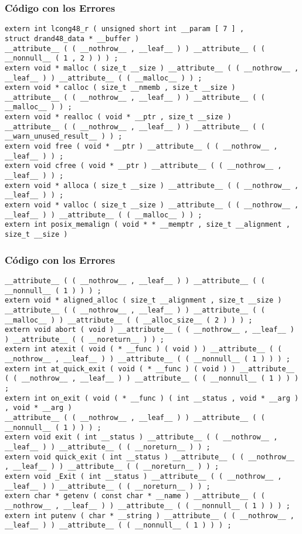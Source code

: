 \documentclass{beamer}
\begin{document}
\begin{frame}[fragile]
\frametitle{C\'odigo con los Errores}
\begin{lstlisting}[style=CStyle]
extern int lcong48_r ( unsigned short int __param [ 7 ] , 
struct drand48_data * __buffer ) 
__attribute__ ( ( __nothrow__ , __leaf__ ) ) __attribute__ ( ( __nonnull__ ( 1 , 2 ) ) ) ; 
extern void * malloc ( size_t __size ) __attribute__ ( ( __nothrow__ , __leaf__ ) ) __attribute__ ( ( __malloc__ ) ) ; 
extern void * calloc ( size_t __nmemb , size_t __size ) 
__attribute__ ( ( __nothrow__ , __leaf__ ) ) __attribute__ ( ( __malloc__ ) ) ; 
extern void * realloc ( void * __ptr , size_t __size ) 
__attribute__ ( ( __nothrow__ , __leaf__ ) ) __attribute__ ( ( __warn_unused_result__ ) ) ; 
extern void free ( void * __ptr ) __attribute__ ( ( __nothrow__ , __leaf__ ) ) ; 
extern void cfree ( void * __ptr ) __attribute__ ( ( __nothrow__ , __leaf__ ) ) ; 
extern void * alloca ( size_t __size ) __attribute__ ( ( __nothrow__ , __leaf__ ) ) ; 
extern void * valloc ( size_t __size ) __attribute__ ( ( __nothrow__ , __leaf__ ) ) __attribute__ ( ( __malloc__ ) ) ; 
extern int posix_memalign ( void * * __memptr , size_t __alignment , size_t __size ) 
\end{lstlisting}
\end{frame}
\begin{frame}[fragile]
\frametitle{C\'odigo con los Errores}
\begin{lstlisting}[style=CStyle]
__attribute__ ( ( __nothrow__ , __leaf__ ) ) __attribute__ ( ( __nonnull__ ( 1 ) ) ) ; 
extern void * aligned_alloc ( size_t __alignment , size_t __size ) 
__attribute__ ( ( __nothrow__ , __leaf__ ) ) __attribute__ ( ( __malloc__ ) ) __attribute__ ( ( __alloc_size__ ( 2 ) ) ) ; 
extern void abort ( void ) __attribute__ ( ( __nothrow__ , __leaf__ ) ) __attribute__ ( ( __noreturn__ ) ) ; 
extern int atexit ( void ( * __func ) ( void ) ) __attribute__ ( ( __nothrow__ , __leaf__ ) ) __attribute__ ( ( __nonnull__ ( 1 ) ) ) ; 
extern int at_quick_exit ( void ( * __func ) ( void ) ) __attribute__ ( ( __nothrow__ , __leaf__ ) ) __attribute__ ( ( __nonnull__ ( 1 ) ) ) ; 
extern int on_exit ( void ( * __func ) ( int __status , void * __arg ) , void * __arg ) 
__attribute__ ( ( __nothrow__ , __leaf__ ) ) __attribute__ ( ( __nonnull__ ( 1 ) ) ) ; 
extern void exit ( int __status ) __attribute__ ( ( __nothrow__ , __leaf__ ) ) __attribute__ ( ( __noreturn__ ) ) ; 
extern void quick_exit ( int __status ) __attribute__ ( ( __nothrow__ , __leaf__ ) ) __attribute__ ( ( __noreturn__ ) ) ; 
extern void _Exit ( int __status ) __attribute__ ( ( __nothrow__ , __leaf__ ) ) __attribute__ ( ( __noreturn__ ) ) ; 
extern char * getenv ( const char * __name ) __attribute__ ( ( __nothrow__ , __leaf__ ) ) __attribute__ ( ( __nonnull__ ( 1 ) ) ) ; 
extern int putenv ( char * __string ) __attribute__ ( ( __nothrow__ , __leaf__ ) ) __attribute__ ( ( __nonnull__ ( 1 ) ) ) ; 
\end{lstlisting}
\end{frame}
\end{document}
